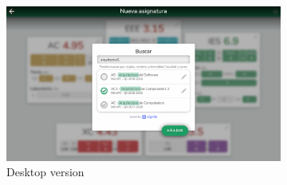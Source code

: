 \vfill
\begin{figure}[ht!]
    \begin{subfigure}[b]{0.757\textwidth-0.1cm}
        \centering
        \includegraphics[width=\textwidth]{media/screenshots/screenshot-search-filled-pc.png}
        \caption{Desktop version}
    \end{subfigure}
    \hfill
    \begin{subfigure}[b]{0.243\textwidth-0.1cm}
        \centering

\end{subfigure}
\end{figure}
